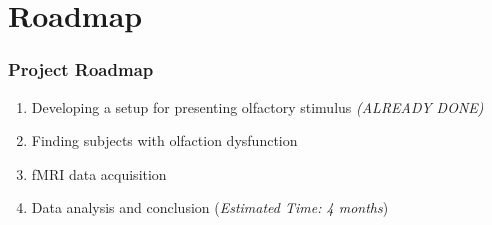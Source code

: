 \documentclass{beamer}
\begin{document}
\section{Roadmap}
\begin{frame}
\frametitle{Project Roadmap}
	\begin{enumerate}
		\item
		Developing a setup for presenting olfactory stimulus \textit{(ALREADY DONE)}
		\item
		Finding subjects with olfaction dysfunction
		\item
		fMRI data acquisition
		\item
		Data analysis and conclusion (\textit{Estimated Time: 4 months})
	\end{enumerate}

\end{frame}

\end{document}

